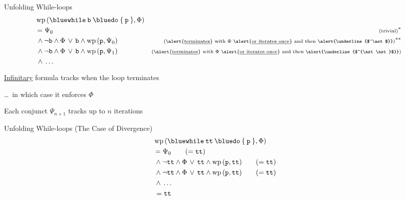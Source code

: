 \documentclass{beamer}
\begin{document}
\begin{frame}{Unfolding While-loops}
        \begin{align*}
         & \, \mathrm{wp} \, ({\mathtt{{\blue while} \> b \> {\blue do} \> \{ \> p \> \}} }, \Phi)
         \\
         & = \Psi_0
         & {\scriptsize \text{(trivial)}^\ast }
         \\
         & \, \wedge \neg \prog{b} \wedge \Phi \, \vee \, \prog{b} \wedge \mathrm{wp} \, (\prog{p},\Psi_0)
         & {\scriptsize \text{(\alert{\underline{terminates}} with $\Phi$ 
         \alert{\underline{or iterates once}} and then \alert{\underline{$^\ast$}})}^{\ast \ast} }
         \\
         & \, \wedge \neg \prog{b} \wedge \Phi \, \vee \, \prog{b} \wedge \mathrm{wp} \, (\prog{p},\Psi_1)
         & {\scriptsize \text{(\alert{\underline{terminates}} 
                         with $\Phi$  \alert{\underline{or iterates once}} 
         and then \alert{\underline{$^{\ast \ast}$}})} }
         \\
         & \, \wedge \, \dots
        \end{align*}
        
        \pause
        \alert{\underline{Infinitary}} formula tracks when the loop terminates

        \dots\ in which case it enforces $\Phi$

        Each conjunct $\Psi_{n+1}$ tracks up to $n$ iterations
\end{frame}

\begin{frame}{Unfolding While-loops (The Case of Divergence) }
        \begin{align*}
         & \, \mathrm{wp} \, ({\mathtt{{\blue while} \> \prog{tt} \> {\blue do} \> \{ \> p \> \}} }, \Phi)
         \\
         & = \Psi_0 \qquad ( = \prog{tt} )
         & %
         \\
         & \, \wedge \neg \prog{tt} \wedge \Phi \, \vee \, \prog{tt} \wedge \mathrm{wp} \, (\prog{p},\prog{tt})
         \qquad ( = \prog{ tt} )
         & %
         \\
         & \, \wedge \neg \prog{tt} \wedge \Phi \, \vee \, \prog{tt} \wedge \mathrm{wp} \, (\prog{p},\prog{tt})
         \qquad ( = \prog{ tt } )
         &
         \\
         & \, \wedge \, \dots
         \\
         & \, =  \prog{tt}
        \end{align*}
\end{frame}
\end{document}
